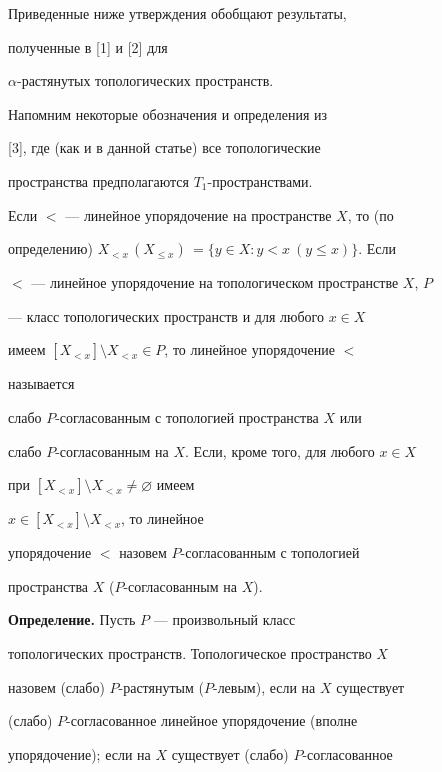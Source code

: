 \label{begin} 


 


Приведенные ниже утверждения обобщают результаты, 


полученные в [1] и [2] для 


$\alpha$-растянутых топологических пространств.  


 


Напомним некоторые обозначения и определения из 


[3], где (как и в данной статье) все топологические  


пространства предполагаются $T_1$-пространствами. 


 


Если $<$ --- линейное упорядочение на пространстве $X$, то (по 


определению) $X_{<x}\,(X_{\le x})\,=\{y\in X:y<x\ (y\le x)\}$. Если  


$<$ --- линейное упорядочение на топологическом пространстве $X$, $P$ 


--- класс топологических пространств и для любого $x\in X$ 


имеем $[X_{<x}]\setminus X_{<x}\in P$, то линейное упорядочение $<$ 


называется  


слабо $P$-согласованным с топологией пространства $X$ или 


слабо $P$-согласованным на $X$. Если, кроме того, для любого $x\in X$ 


при $[X_{<x}]\setminus X_{<x}\ne\varnothing$ имеем 


$x\in[X_{<x}]\setminus X_{<x}$, то линейное  


упорядочение $<$ назовем $P$-согласованным с топологией  


пространства $X$ ($P$-согласованным на $X$). 


\medskip 


 


{\bf Определение.} Пусть $P$ --- произвольный класс  


топологических пространств. Топологическое пространство $X$  


назовем (слабо) $P$-растянутым ($P$-левым), если на $X$ существует  


(слабо) $P$-согласованное линейное упорядочение (вполне  


упорядочение); если на $X$ существует (слабо) $P$-согласованное 


